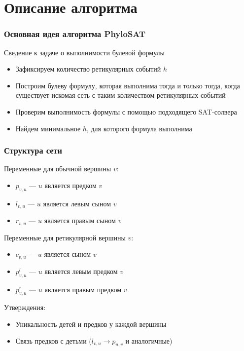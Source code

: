 \documentclass[hyperref={unicode}]{beamer}
\begin{document}
\section{Описание алгоритма}

\begin{frame}
\frametitle{Основная идея алгоритма PhyloSAT}

Сведение к задаче о выполнимости булевой формулы

\begin{itemize}
	\item Зафиксируем количество ретикулярных событий $h$
	\item Построим булеву формулу, которая выполнима тогда и только тогда, когда существует искомая сеть с таким количеством ретикулярных событий
	\item Проверим выполнимость формулы с помощью подходящего SAT-солвера
	\item Найдем минимальное $h$, для которого формула выполнима
\end{itemize}

\end{frame}

\begin{frame}
\frametitle{Структура сети}

Переменные для обычной вершины $v$:

\begin{itemize}
	\item $p_{v, u}$ --- $u$ является предком $v$
	\item $l_{v, u}$ --- $u$ является левым сыном $v$
	\item $r_{v, u}$ --- $u$ является правым сыном $v$
\end{itemize}

Переменные для ретикулярной вершины $v$:

\begin{itemize}
	\item $c_{v, u}$ --- $u$ является сыном $v$
	\item $p^l_{v, u}$ --- $u$ является левым предком $v$
	\item $p^r_{v, u}$ --- $u$ является правым предком $v$
\end{itemize}

Утверждения:
\begin{itemize}
	\item Уникальность детей и предков у каждой вершины
	\item Связь предков с детьми ($l_{v, u} \rightarrow p_{u, v}$ и аналогичные)
\end{itemize}

\end{frame}
\end{document}
